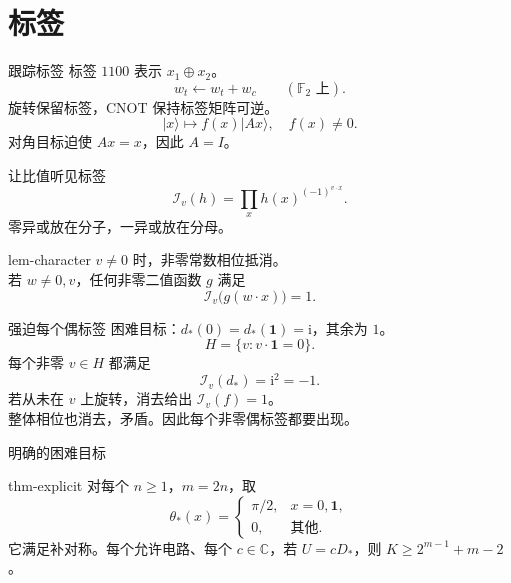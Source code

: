 \documentclass{beamer}
\begin{document}
\section{标签}
\begin{frame}{跟踪标签}
标签 $1100$ 表示 $x_1\oplus x_2$。
\[w_t\longleftarrow w_t+w_c\qquad(\mathbb F_2\text{ 上}).\]
旋转保留标签，CNOT 保持标签矩阵可逆。
\[|x\rangle\longmapsto f(x)|Ax\rangle,\quad f(x)\ne0.\]
对角目标迫使 $Ax=x$，因此 $A=I$。
\end{frame}
\begin{frame}{让比值听见标签}
\[\mathcal I_v(h)=\prod_x h(x)^{(-1)^{v\cdot x}}.\]
零异或放在分子，一异或放在分母。
\begin{bookresult}{lem-character}
$v\ne0$ 时，非零常数相位抵消。\\
若 $w\ne0,v$，任何非零二值函数 $g$ 满足
\[\mathcal I_v\bigl(g(w\cdot x)\bigr)=1.\]
\end{bookresult}
\end{frame}
\begin{frame}{强迫每个偶标签}
困难目标：$d_*(0)=d_*(\mathbf1)=\mathrm i$，其余为 $1$。
\[H=\{v:v\cdot\mathbf1=0\}.\]
每个非零 $v\in H$ 都满足
\[\mathcal I_v(d_*)=\mathrm i^2=-1.\]
若从未在 $v$ 上旋转，消去给出 $\mathcal I_v(f)=1$。\\[.5em]
整体相位也消去，矛盾。因此每个非零偶标签都要出现。
\end{frame}
\begin{frame}{明确的困难目标}
\begin{bookresult}{thm-explicit}
对每个 $n\geq1$，$m=2n$，取
\[\theta_*(x)=\begin{cases}\pi/2,&x=0,\mathbf1,\\0,&\text{其他} .\end{cases}\]
它满足补对称。每个允许电路、每个 $c\in\mathbb C$，若
$U=cD_*$，则 $K\geq2^{m-1}+m-2$。
\end{bookresult}
\end{frame}
\end{document}
